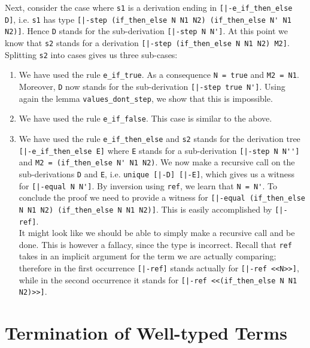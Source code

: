 Next, consider the case where \lstinline!s1! is a derivation ending in
\lstinline![|-e_if_then_else D]!, i.e. \lstinline!s1! has type
\lstinline![|-step (if_then_else N N1 N2) (if_then_else N' N1 N2)]!. Hence \lstinline!D! stands for the sub-derivation
\lstinline![|-step N N']!. At this point we know that \lstinline!s2! stands
for a derivation \lstinline![|-step (if_then_else N N1 N2) M2]!. Splitting
\lstinline!s2! into cases gives us three sub-cases:

\begin{enumerate}
\item We have used the rule \lstinline!e_if_true!. As a consequence
  \lstinline!N = true! and \lstinline!M2 = N1!. Moreover,
  \lstinline!D! now stands for the sub-derivation \lstinline![|-step true N']!.
  Using again the lemma \lstinline!values_dont_step!, we show that this is impossible.

\item We have used the rule \lstinline!e_if_false!. This case is
  similar to the above.

\item We have used the rule \lstinline!e_if_then_else! and
  \lstinline!s2! stands for the derivation tree
\mbox{\lstinline![|-e_if_then_else E]!} where \lstinline!E! stands for a sub-derivation
\lstinline![|-step N N'']! and \lstinline!M2 = (if_then_else N' N1 N2)!.
We now make a recursive call on the sub-derivations \lstinline!D! and
\lstinline!E!, i.e. \lstinline!unique [|-D] [|-E]!, which gives us a
witness for
\mbox{\lstinline![|-equal N N']!}. By inversion using \lstinline!ref!, we learn that
\lstinline!N = N'!. To conclude the proof we need to provide a witness for
\lstinline![|-equal (if_then_else N N1 N2) (if_then_else N N1 N2)]!. This is easily
accomplished by \lstinline![|-ref]!. \\[0.5em]
It might look like we should be able to simply make a recursive call
and be done. This is
however a fallacy, since the type is incorrect. Recall that \lstinline!ref!
takes in an implicit argument for the term we are actually comparing; therefore
in the first occurrence \lstinline![|-ref]! stands actually for
\lstinline![|-ref <<N>>]!, while in the second occurrence it
stands for \lstinline![|-ref <<(if_then_else N N1 N2)>>]!.
\end{enumerate}

\section{Termination of Well-typed Terms}

